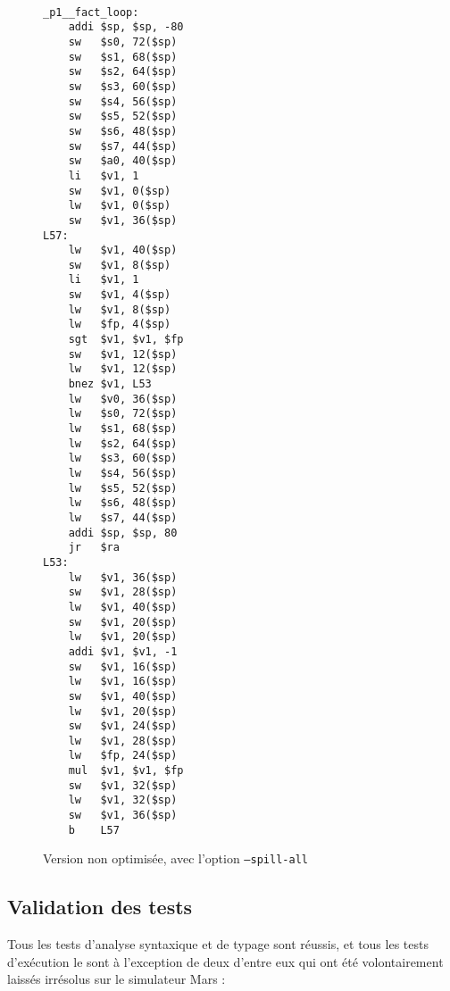 \documentclass[11pt, a4paper]{article}
\newcommand{\prog}[1]{{\tt#1}}
\begin{document}
\begin{figure}[p]
\centering
\begin{multicols}{2}
\begin {lstlisting}[basicstyle=\ttfamily, frame=none]  %

_p1__fact_loop:
	addi $sp, $sp, -80
	sw   $s0, 72($sp)
	sw   $s1, 68($sp)
	sw   $s2, 64($sp)
	sw   $s3, 60($sp)
	sw   $s4, 56($sp)
	sw   $s5, 52($sp)
	sw   $s6, 48($sp)
	sw   $s7, 44($sp)
	sw   $a0, 40($sp)
	li   $v1, 1
	sw   $v1, 0($sp)
	lw   $v1, 0($sp)
	sw   $v1, 36($sp)
L57:
	lw   $v1, 40($sp)
	sw   $v1, 8($sp)
	li   $v1, 1
	sw   $v1, 4($sp)
	lw   $v1, 8($sp)
	lw   $fp, 4($sp)
	sgt  $v1, $v1, $fp
	sw   $v1, 12($sp)
	lw   $v1, 12($sp)
	bnez $v1, L53
	lw   $v0, 36($sp)
	lw   $s0, 72($sp)
	lw   $s1, 68($sp)
	lw   $s2, 64($sp)
	lw   $s3, 60($sp)
	lw   $s4, 56($sp)
	lw   $s5, 52($sp)
	lw   $s6, 48($sp)
	lw   $s7, 44($sp)
	addi $sp, $sp, 80
	jr   $ra
L53:
	lw   $v1, 36($sp)
	sw   $v1, 28($sp)
	lw   $v1, 40($sp)
	sw   $v1, 20($sp)
	lw   $v1, 20($sp)
	addi $v1, $v1, -1
	sw   $v1, 16($sp)
	lw   $v1, 16($sp)
	sw   $v1, 40($sp)
	lw   $v1, 20($sp)
	sw   $v1, 24($sp)
	lw   $v1, 28($sp)
	lw   $fp, 24($sp)
	mul  $v1, $v1, $fp
	sw   $v1, 32($sp)
	lw   $v1, 32($sp)
	sw   $v1, 36($sp)
	b    L57

\end{lstlisting}
\end{multicols}
\bigskip
\caption{Version non optimisée, avec l'option \prog{--spill-all}}
\label{fact-2}
\end{figure}

\subsection{Validation des tests}
Tous les tests d'analyse syntaxique et de typage sont réussis, et tous les tests d'exécution le sont à l'exception de deux d'entre eux qui ont été volontairement laissés irrésolus sur le simulateur Mars :
\end{document}
